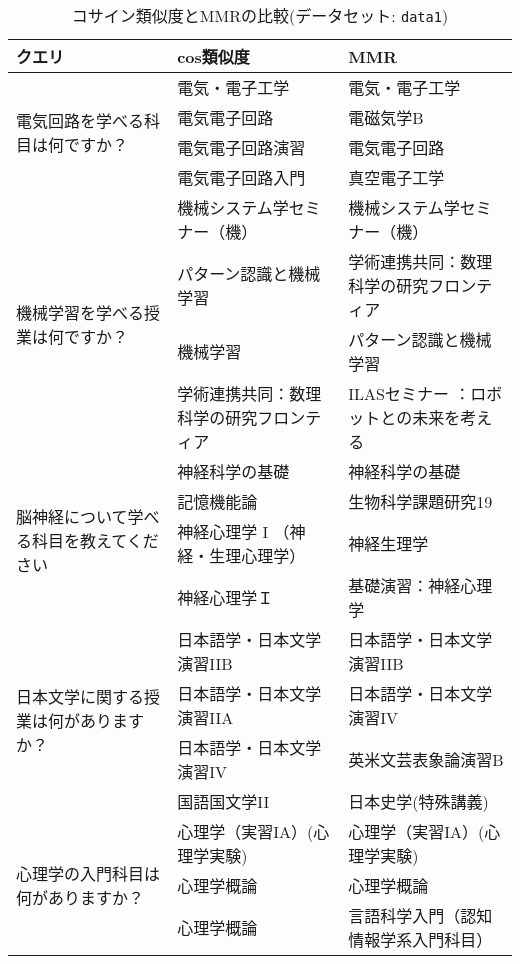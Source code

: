 \begin{table}[htbp]
    \centering
    \caption{コサイン類似度とMMRの比較(データセット: \texttt{data1})}
    \label{tab:question_similarity_mmr_data1}
    {\small
    \begin{tabular}{|p{2.5cm}|p{5.5cm}|p{5.5cm}|}
        \hline
        \textbf{クエリ} & \textbf{cos類似度} & \textbf{MMR} \\ \hline
        \multirow{4}{2.5cm}{電気回路を学べる科目は何ですか？} & 
        電気・電子工学 & 電気・電子工学 \\
        & 電気電子回路 & 電磁気学B \\
        & 電気電子回路演習 & 電気電子回路 \\
        & 電気電子回路入門 & 真空電子工学 \\ \hline
        \multirow{4}{2.5cm}{機械学習を学べる授業は何ですか？} & 
        機械システム学セミナー（機） & 機械システム学セミナー（機） \\
        & パターン認識と機械学習 & 学術連携共同：数理科学の研究フロンティア \\
        & 機械学習 & パターン認識と機械学習 \\
        & 学術連携共同：数理科学の研究フロンティア & ILASセミナー ：ロボットとの未来を考える \\ \hline
        \multirow{4}{2.5cm}{脳神経について学べる科目を教えてください} & 
        神経科学の基礎 & 神経科学の基礎 \\
        & 記憶機能論 & 生物科学課題研究19 \\
        & 神経心理学 I （神経・生理心理学） & 神経生理学 \\
        & 神経心理学Ｉ & 基礎演習：神経心理学 \\ \hline
        \multirow{4}{2.5cm}{日本文学に関する授業は何がありますか？} & 
        日本語学・日本文学演習IIB & 日本語学・日本文学演習IIB \\
        & 日本語学・日本文学演習IIA & 日本語学・日本文学演習IV \\
        & 日本語学・日本文学演習IV & 英米文芸表象論演習B \\
        & 国語国文学II & 日本史学(特殊講義) \\ \hline
        \multirow{4}{2.5cm}{心理学の入門科目は何がありますか？} & 
        心理学（実習IA）(心理学実験) & 心理学（実習IA）(心理学実験) \\
        & 心理学概論 & 心理学概論 \\
        & 心理学概論 & 言語科学入門（認知情報学系入門科目） \\

\end{tabular}}
\end{table}
